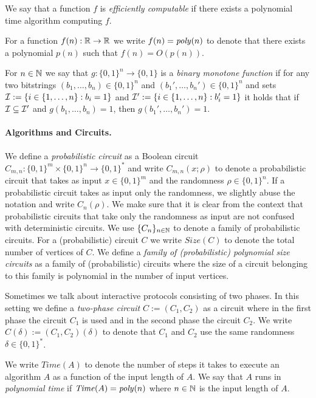 We say that a function $f$ is \textit{efficiently computable} if there exists a polynomial time algorithm computing $f$.

For a function $f(n): \mathbb{R} \rightarrow \mathbb{R}$ we write $f(n) = \operatorname{\mathit{poly}}(n)$ to denote that there exists a polynomial $p(n)$
such that $f(n) = O(p(n))$.

\begin{definition}
For $n \in \mathbb{N}$ we say that $g: \{0,1\}^n \rightarrow \{0,1\}$ is a \textit{binary monotone function}
if for any two bitstrings $(b_1, \dotsc, b_n) \in \{0,1\}^{n}$ and $(b_1', \dotsc, b_n') \in \{0,1\}^{n}$
and sets $\mathcal{I} := \{i \in \{1,\dotsc, n\}: b_i = 1\}$ and $\mathcal{I}' := \{i \in \{1,\dotsc, n\} : b_i' = 1\}$ it holds
that if $\mathcal{I} \subseteq \mathcal{I}'$ and $g(b_1, \dotsc, b_n) = 1$, then $g(b_1', \dotsc, b_n') = 1$.
\end{definition}

\paragraph{Algorithms and Circuits.}
We define a \textit{probabilistic circuit} as a Boolean circuit $C_{m,n} : \{0,1\}^{m} \times \{0,1\}^{n} \rightarrow \{0,1\}^{*}$ and
write $C_{m,n}(x;\rho)$ to denote a probabilistic circuit that takes as input $x \in \{0,1\}^{m}$ and the randomness $\rho \in \{0,1\}^{n}$.
If a probabilistic circuit takes as input only the randomness, we slightly abuse the notation and write $C_{n}(\rho)$.
We make sure that it is clear from the context that probabilistic circuits that take only the randomness as input
are not confused with deterministic circuits. We use $\{C_n\}_{n \in \mathbb{N}}$ to denote a family of probabilistic circuits.
For a (probabilistic) circuit $C$ we write $\mathit{Size}(C)$ to denote the total number of vertices of $C$.
We define a \textit{family of (probabilistic) polynomial size circuits} as a family of (probabilistic) circuits where
the size of a circuit belonging to this family is polynomial in the number of input vertices.

Sometimes we talk about interactive protocols consisting of two phases.
In this setting we define a \textit{two-phase circuit} $C := (C_1, C_2)$ as a circuit
where in the first phase the circuit $C_1$ is used and in the second phase the circuit $C_2$.
We write $C(\delta) := (C_1, C_2)(\delta)$ to denote that $C_1$ and $C_2$ use the same randomness $\delta \in \{0,1\}^{*}$.

We write $\mathit{Time}(A)$ to denote the number of steps it takes to execute
an algorithm $A$ as a function of the input length of $A$.
We say that $A$ runs in \textit{polynomial time} if $\operatorname{\mathit{Time}}(A) = \operatorname{\mathit{poly}}(n)$ where $n \in \mathbb{N}$ is the input length of $A$.

